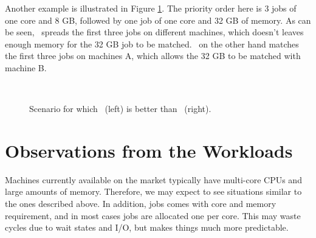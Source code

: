Another example is illustrated in Figure \ref{fig:bf_better}.
The priority order here is 3 jobs of one core and 8 GB, followed by
one job of one core and 32 GB of memory.
As can be seen, \wof\ spreads the first three jobs on different
machines, which doesn't leaves enough memory for the 32 GB job to be
matched.
\bef\ on the other hand matches the first three jobs on machines A, 
which allows the 32 GB to be matched with machine B.

\begin{figure}\centering
{}
~~~~
\caption{Scenario for which \bef\ (left) is better than \wof\ (right). }
\label{fig:bf_better}
\end{figure}


\section{Observations from the Workloads}

Machines currently available on the market typically have multi-core
CPUs and large amounts of memory.
Therefore, we may expect to see situations similar to the ones
described above.
In addition, jobs comes with core and memory requirement, and in most
cases jobs are allocated one per core.
This may waste cycles due to wait states and I/O, but makes things
much more predictable.

